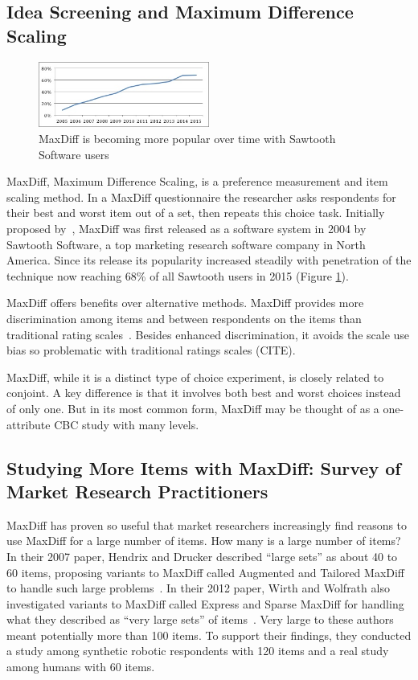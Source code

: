 \documentclass[nonblindrev]{informs3}
\begin{document}
\subsection{Idea Screening and Maximum Difference Scaling}
\begin{figure}
\caption{MaxDiff is becoming more popular over time with Sawtooth Software users} \label{fig:pop}
\begin{center}
\includegraphics[width=0.5\textwidth]{plots/maxdiffpop}
\end{center}
\end{figure}
MaxDiff, Maximum Difference Scaling, is a preference measurement and item scaling method.  In a MaxDiff questionnaire the researcher asks respondents for their best and worst item out of a set, then repeats this choice task. Initially proposed by~\cite{louviere1991best}, MaxDiff was first released as a software system in 2004 by Sawtooth Software, a top marketing research software company in North America. Since its release its popularity increased steadily with penetration of the technique now reaching 68\% of all Sawtooth users in 2015 (Figure \ref{fig:pop}). 

MaxDiff offers benefits over alternative methods. MaxDiff provides more discrimination among items and between respondents on the items than traditional rating scales~\cite{cohen2004s}. Besides enhanced discrimination, it avoids the scale use bias so problematic with traditional ratings scales (CITE).

MaxDiff, while it is a distinct type of choice experiment, is closely related to conjoint. A key difference is that it involves both best and worst choices instead of only one. But in its most common form, MaxDiff may be thought of as a one-attribute CBC study with many levels.  

\subsection{Studying More Items with MaxDiff: Survey of Market Research Practitioners}
MaxDiff has proven so useful that market researchers increasingly find reasons to use MaxDiff for a large number of items.  How many is a large number of items?  In their 2007 paper, Hendrix and Drucker described ``large sets'' as about 40 to 60 items, proposing variants to MaxDiff called Augmented and Tailored MaxDiff to handle such large problems~\cite{hendrix2007alternative}. In their 2012 paper, Wirth and Wolfrath also investigated variants to MaxDiff called Express and Sparse MaxDiff for handling what they described as ``very large sets'' of items~\cite{wirth2012largeset}.  Very large to these authors meant potentially more than 100 items.  To support their findings, they conducted a study among synthetic robotic respondents with 120 items and a real study among humans with 60 items.
\end{document}
